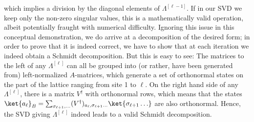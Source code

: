 which implies a division by the diagonal elements of $\Lambda^{[\ell-1]}$. If in our SVD we keep only the non-zero singular values, this is a mathematically valid operation, albeit potentially fraught with numerical difficulty. Ignoring this issue in this conceptual demonstration, we do arrive at a decomposition of the desired form; in order to prove that it is indeed correct, we have to show that at each iteration we indeed obtain a Schmidt decomposition. But this is easy to see: The matrices to the left of any $\Lambda^{[\ell]}$ can all be grouped into (or rather, have been generated from) left-normalized $A$-matrices, which generate a set of orthonormal states on the part of the lattice ranging from site 1 to $\ell$. On the right hand side of any $\Lambda^{[\ell]}$, there is a matrix $V^\dagger$ with orthonormal rows, which means that the states $\ket{a_\ell}_B = \sum_{\sigma_{\ell+1},\ldots}
(V^\dagger)_{a_\ell, \sigma_{\ell+1} \ldots} \ket{\sigma_{\ell+1} \ldots}$ are also orthonormal. Hence, the SVD giving $\Lambda^{[\ell]}$ indeed leads to a valid Schmidt decomposition.

